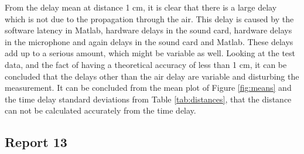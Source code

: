 \documentclass[final]{scrreprt} %
\begin{document}
From the delay mean at distance 1 cm, it is clear that there is a large delay which is not due to the propagation through the air.
This delay is caused by the software latency in Matlab, hardware delays in the sound card, hardware delays in the microphone and again delays in the sound card and Matlab.
These delays add up to a serious amount, which might be variable as well.
Looking at the test data, and the fact of having a theoretical accuracy of less than 1 cm, it can be concluded that the delays other than the air delay are variable and disturbing the measurement.
It can be concluded from the mean plot of Figure \ref{fig:means} and the time delay standard deviations from Table \ref{tab:distances}, that the distance can not be calculated accurately from the time delay.

\subsection*{Report 13}
\end{document}
